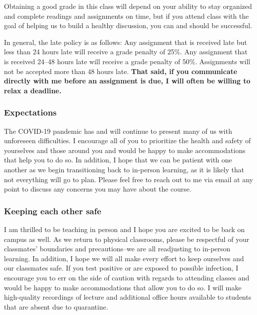 \documentclass[
]{article}
\begin{document}
Obtaining a good grade in this class will depend on your ability to stay
organized and complete readings and assignments on time, but if you
attend class with the goal of helping us to build a healthy discussion,
you can and should be successful.

In general, the late policy is as follows: Any assignment that is
received late but less than 24 hours late will receive a grade penalty
of 25\%. Any assignment that is received 24--48 hours late will receive
a grade penalty of 50\%. Assignments will not be accepted more than 48
hours late. \textbf{That said, if you communicate directly with me
before an assignment is due, I will often be willing to relax a
deadline.}

\hypertarget{expectations}{%
\subsubsection{Expectations}\label{expectations}}

The COVID-19 pandemic has and will continue to present many of us with
unforeseen difficulties. I encourage all of you to prioritize the health
and safety of yourselves and those around you and would be happy to make
accommodations that help you to do so. In addition, I hope that we can
be patient with one another as we begin transitioning back to in-person
learning, as it is likely that not everything will go to plan. Please
feel free to reach out to me via email at any point to discuss any
concerns you may have about the course.

\hypertarget{keeping-each-other-safe}{%
\subsubsection{Keeping each other safe}\label{keeping-each-other-safe}}

I am thrilled to be teaching in person and I hope you are excited to be
back on campus as well. As we return to physical classrooms, please be
respectful of your classmates' boundaries and precautions--we are all
readjusting to in-person learning. In addition, I hope we will all make
every effort to keep ourselves and our classmates safe. If you test
positive or are exposed to possible infection, I encourage you to err on
the side of caution with regards to attending classes and would be happy
to make accommodations that allow you to do so. I will make high-quality
recordings of lecture and additional office hours available to students
that are absent due to quarantine.
\end{document}
